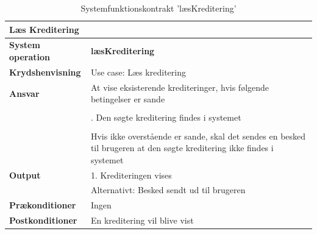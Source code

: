 
\begin{table}[H]
    \begin{tabularx}{\textwidth}{|p{4cm}|X|}
        \hline
        \multicolumn{2}{|X|}{\textbf{Læs Kreditering}}\\ 
        \hline
        \textbf{System operation}       & \textbf{læsKreditering} \\ \hline
        \textbf{Krydshenvisning}        & Use case: Læs kreditering \\ \hline
        \textbf{Ansvar}                 & At vise eksisterende krediteringer, hvis følgende betingelser er sande \\ 
                                        & \\
                                        & \quad 1. Den søgte kreditering findes i systemet\\
                                        & \\
                                        & Hvis ikke overstående er sande, skal det sendes en besked til brugeren at den søgte kreditering ikke findes i systemet\\\hline
        \textbf{Output}                 & 1. Krediteringen vises\\ 
                                        & Alternativt: Besked sendt ud til brugeren\\ \hline
        \textbf{Prækonditioner}         & Ingen \\ \hline
        \textbf{Postkonditioner}        & En kreditering vil blive vist \\ \hline
    \end{tabularx}
    \caption{Systemfunktionskontrakt 'læsKreditering'}
    \label{tab:kontrakter_læs_kreditering}
\end{table}


